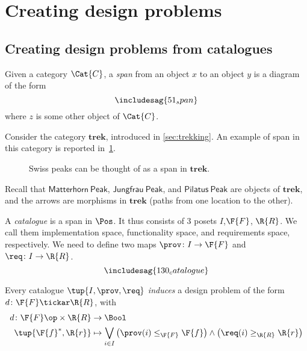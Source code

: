 \section{Creating design problems}
\subsection{Creating design problems from catalogues}
\begin{shaded}
\begin{definition}[Span]
Given a category $\Cat{C}$, a \emph{span} from an object $x$ to an object $y$ is a diagram of the form
\begin{equation}
\includesag{51_span}
\end{equation}
where $z$ is some other object of $\Cat{C}$. 
\end{definition}
\end{shaded}
\begin{example}
Consider the category $\mathbf{trek}$, introduced in \cref{sec:trekking}. An example of span in this category is reported in~\cref{fig:exmountains}.
\begin{figure}[h!]
\begin{center}
\end{center}
\caption{Swiss peaks can be thought of as a span in $\mathbf{trek}$. \label{fig:exmountains}}
\end{figure}
Recall that $\mathsf{Matterhorn \ Peak}$, $\mathsf{Jungfrau \ Peak}$, and $\mathsf{Pilatus \ Peak}$ are objects of $\mathbf{trek}$, and the arrows are morphisms in $\mathbf{trek}$ (paths from one location to the other).
\end{example}

\begin{definition}[Catalogue] \label{def:catalogue}
A \emph{catalogue} is a span in $\Pos$.
It thus consists of 3 posets $I$,$\F{F}$, $\R{R}$.
We call them implementation space, functionality space, and requirements space, respectively. We need to define two maps $\prov \colon I \to \F{F}$
and $\req\colon I \to \R{R}$.
\begin{equation}
\includesag{130_catalogue}
\end{equation}
\end{definition}

\begin{definition}
Every catalogue $\tup{I,\prov,\req}$ \emph{induces} a design problem of the form $d\colon \F{F}\tickar \R{R}$, with
\begin{equation}
    \begin{aligned}
    d\colon \F{F}\op \times \R{R}&\to \Bool\\
    \tup{\F{f}^*,\R{r}}&\mapsto \bigvee_{i\in I}\left(\prov(i)\leq_{\F{F}}\F{f} \right)\wedge \left( \req(i)\geq_{\R{R}}\R{r}\right)
    \end{aligned}
\end{equation}
\end{definition}

